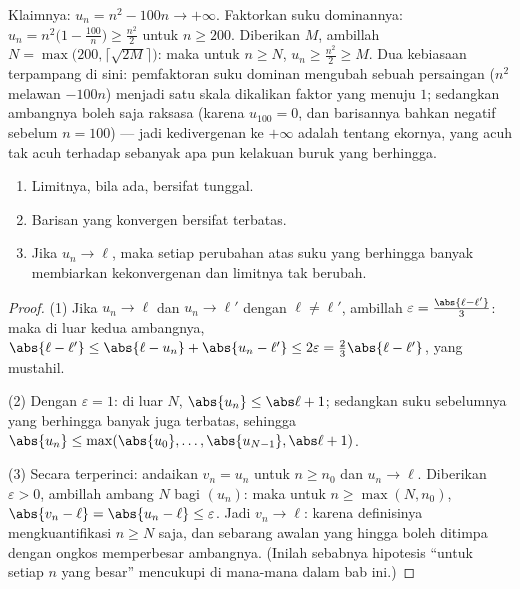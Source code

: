 \begin{example}\label{ex:b1:seq:toinfinity}
Klaimnya: $u_n = n^2 - 100n \to +\infty$. Faktorkan suku dominannya:
$u_n = n^2\bigl(1 - \frac{100}{n}\bigr) \geq \frac{n^2}{2}$ untuk
$n \geq 200$. Diberikan $M$, ambillah $N = \max\bigl(200,
\lceil\sqrt{2M}\rceil\bigr)$: maka untuk $n \geq N$, $u_n \geq
\frac{n^2}{2} \geq M$. Dua kebiasaan terpampang di sini: pemfaktoran suku
dominan mengubah sebuah persaingan ($n^2$ melawan $-100n$) menjadi
satu skala dikalikan faktor yang menuju $1$; sedangkan ambangnya
boleh saja raksasa (karena $u_{100} = 0$, dan barisannya bahkan negatif sebelum
$n = 100$) --- jadi kedivergenan ke $+\infty$ adalah  tentang
ekornya, yang acuh tak acuh terhadap sebanyak apa pun kelakuan buruk yang berhingga.
\end{example}

\begin{proposition}\label{prop:b1:seq:first}
\begin{enumerate}
  \item Limitnya, bila ada, bersifat tunggal.
  \item Barisan yang konvergen bersifat terbatas.
  \item Jika $u_n \to \ell$, maka setiap perubahan atas suku yang berhingga banyak
        membiarkan kekonvergenan dan limitnya tak berubah.
\end{enumerate}
\end{proposition}

\begin{proof}
(1) Jika $u_n \to \ell$ dan $u_n \to \ell'$ dengan $\ell \neq \ell'$,
ambillah $\varepsilon = \frac{\abs{\ell - \ell'}}{3}$: maka di luar kedua
ambangnya, $\abs{\ell - \ell'} \leq \abs{\ell - u_n} + \abs{u_n -
\ell'} \leq 2\varepsilon = \frac23 \abs{\ell - \ell'}$, yang mustahil.

(2) Dengan $\varepsilon = 1$: di luar $N$, $\abs{u_n} \leq \abs\ell +
1$; sedangkan suku sebelumnya yang berhingga banyak juga terbatas, sehingga $\abs{u_n}
\leq \max(\abs{u_0}, \dots, \abs{u_{N-1}}, \abs\ell + 1)$.

(3) Secara terperinci: andaikan $v_n = u_n$ untuk $n \geq n_0$ dan $u_n \to
\ell$. Diberikan $\varepsilon > 0$, ambillah ambang $N$ bagi
$(u_n)$: maka untuk $n \geq \max(N, n_0)$, $\abs{v_n - \ell} = \abs{u_n
- \ell} \leq \varepsilon$. Jadi $v_n \to \ell$: karena definisinya
mengkuantifikasi $n \geq N$ saja, dan sebarang awalan yang hingga boleh
ditimpa dengan ongkos memperbesar ambangnya. (Inilah sebabnya
hipotesis ``untuk setiap $n$ yang besar'' mencukupi di mana-mana dalam bab
ini.)
\end{proof}

